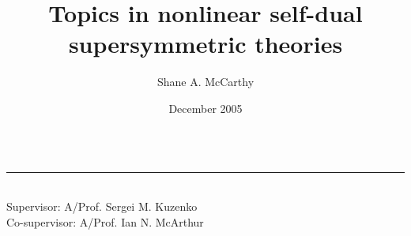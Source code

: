 \documentclass[12pt]{uwathes}
\title{Topics in nonlinear self-dual supersymmetric theories}
\author{Shane A. McCarthy}
\date{December 2005}
\begin{document}
\maketitle

\newpage
${}$
\vfill
\noindent \rule{7.5cm}{0.01cm}\\
Supervisor: A/Prof. Sergei M. Kuzenko\\
Co-supervisor: A/Prof. Ian N. McArthur


\cleardoublepage

\tableofcontents      

%
\mainmatter









\appendix








% 

\end{document}
